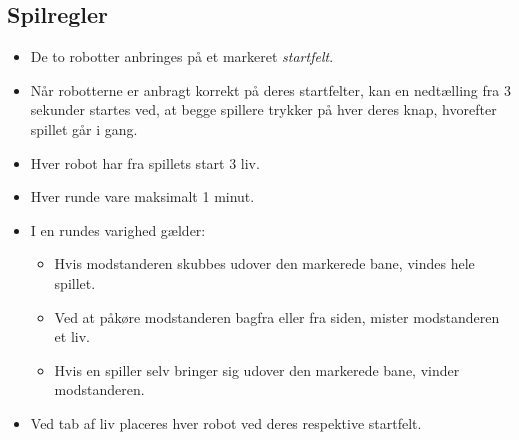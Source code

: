 \subsection{Spilregler} \label{Spilregler}

\begin{itemize}
    \item De to robotter anbringes på et markeret \textit{startfelt}.
    \item Når robotterne er anbragt korrekt på deres startfelter, kan en nedtælling fra 3 sekunder startes ved, at begge spillere trykker på hver deres knap, hvorefter spillet går i gang.
    \item Hver robot har fra spillets start 3 liv.
    \item Hver runde vare maksimalt 1 minut.
    \item I en rundes varighed gælder:
    \begin{itemize}
        \item Hvis modstanderen skubbes udover den markerede bane, vindes hele spillet.
        \item Ved at påkøre modstanderen bagfra eller fra siden, mister modstanderen et liv.
        \item Hvis en spiller selv bringer sig udover den markerede bane, vinder modstanderen.
    \end{itemize}
    \item Ved tab af liv placeres hver robot ved deres respektive startfelt.
\end{itemize}